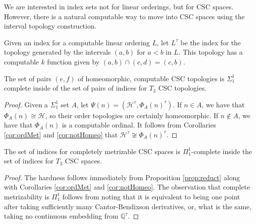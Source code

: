 \documentclass[11pt]{amsart}
\theoremstyle{remark}
\begin{document}

We are interested in index sets not for linear orderings, but for CSC spaces.
However, there is a natural computable way to move into CSC spaces using the interval topology construction.

\begin{definition}
Given an index for a computable linear ordering $L$, let $L^\tau$ be the index for the topology generated by the intervals $(a,b)$ for $a<b$ in $L$.
This topology has a computable $k$ function given by $(a,b)\cap(c,d)=(c,b)$.
\end{definition}


\begin{theorem}
The set of pairs $(e,f)$ of homeomorphic, computable CSC topologies is $\Sigma_1^1$ complete inside of the set of pairs of indices for $T_3$ CSC topologies. 
\end{theorem}

\begin{proof}
Given a $\Sigma_1^1$ set $A$, let $\Psi(n) = (\mathcal{H}^\tau,\Phi_A(n)^\tau)$. 
If $n\in A$, we have that $\Phi_A(n)\cong \mathcal{H}$, so their order topologies are certainly homeomorphic.
If $n\not\in A$, we have that $\Phi_A(n)$ is a computable ordinal.
It follows from Corollaries \ref{cor:ordMet} and \ref{cor:notHomeo} that $\mathcal{H}^\tau\not\cong\Phi_A(n)^\tau$.
\end{proof}

\begin{proposition}
The set of indices for completely metrizable CSC spaces is $\Pi_1^1$-complete inside the set of indices for $T_3$ CSC spaces.
\end{proposition}

\begin{proof}
The hardness follows immediately from Proposition \ref{prop:reduct} along with Corollaries \ref{cor:ordMet} and  \ref{cor:notHomeo}.
The observation that complete metrizability is $\Pi_1^1$ follows from noting that it is equivalent to being one point after taking sufficiently many Cantor-Bendixson derivatives, or, what is the same, taking no continuous embedding from $\mathbb{Q}^\tau$.
\end{proof}
\end{document}
